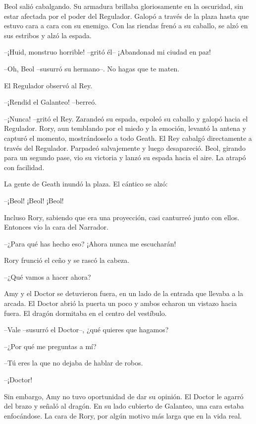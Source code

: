 {Beol salió cabalgando. Su armadura brillaba gloriosamente en la
	oscuridad, sin estar afectada por el poder del Regulador. Galopó a
	través de la plaza hasta que estuvo cara a cara con su enemigo. Con las
riendas frenó a su caballo, se alzó en sus estribos y alzó la espada.}

{--¡Huid, monstruo horrible! --gritó él-- ¡Abandonad mi ciudad en
paz!}

{--Oh, Beol --susurró su hermano--. No hagas que te maten.}

{El Regulador observó al Rey.}

{--¡Rendid el Galanteo! --berreó.}

{--¡Nunca! --gritó el Rey. Zarandeó su espada, espoleó su caballo y
	galopó hacia el Regulador. Rory, aun temblando por el miedo y la
	emoción, levantó la antena y capturó el momento, mostrándoselo a todo
	Geath. El Rey cabalgó directamente a través del Regulador. Parpadeó
	salvajemente y luego desapareció. Beol, girando para un segundo pase,
	vio su victoria y lanzó su espada hacia el aire. La atrapó con
facilidad.}

{La gente de Geath inundó la plaza. El cántico se alzó:}

{--¡Beol! ¡Beol! ¡Beol!}

{Incluso Rory, sabiendo que era una proyección, casi canturreó junto con
ellos. Entonces vio la cara del Narrador.}

{--¿Para qué has hecho eso? ¡Ahora nunca me escucharán!}

{Rory frunció el ceño y se rascó la cabeza.}

{--¿Qué vamos a hacer ahora?}

\mbox{}

{Amy y el Doctor se detuvieron fuera, en un lado de la entrada que
	llevaba a la arcada. El Doctor abrió la puerta un poco y ambos echaron
un vistazo hacia fuera. El dragón dormitaba en el centro del vestíbulo.}

{--Vale --susurró el Doctor--, ¿qué quieres que hagamos?}

{--¿Por qué me preguntas a mí?}

{--Tú eres la que no dejaba de hablar de robos.}

{--¡Doctor!}

{Sin embargo, Amy no tuvo oportunidad de dar su opinión. El Doctor le
	agarró del brazo y señaló al dragón. En su lado cubierto de Galanteo,
	una cara estaba enfocándose. La cara de Rory, por algún motivo más larga
que en la vida real.}

